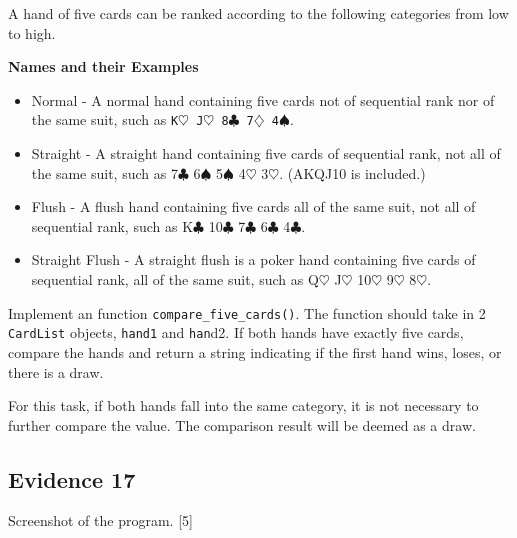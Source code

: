 A hand of five cards can be ranked according to the following categories
from low to high. 

\textbf{Names and their Examples }
\begin{itemize}
\item Normal - A normal hand containing five cards not of sequential rank
nor of the same suit, such as \texttt{K$\heartsuit$ J$\heartsuit$
8$\clubsuit$ 7$\diamondsuit$ 4}$\spadesuit$. 
\item Straight - A straight hand containing five cards of sequential rank,
not all of the same suit, such as 7\texttt{$\clubsuit$} 6$\spadesuit$
5$\spadesuit$ 4\texttt{$\heartsuit$} 3\texttt{$\heartsuit$}. (AKQJ10
is included.) 
\item Flush - A flush hand containing five cards all of the same suit, not
all of sequential rank, such as K\texttt{$\clubsuit$} 10\texttt{$\clubsuit$}
7\texttt{$\clubsuit$} 6\texttt{$\clubsuit$} 4\texttt{$\clubsuit$}. 
\item Straight Flush - A straight flush is a poker hand containing five
cards of sequential rank, all of the same suit, such as Q\texttt{$\heartsuit$}
J\texttt{$\heartsuit$} 10\texttt{$\heartsuit$} 9\texttt{$\heartsuit$}
8\texttt{$\heartsuit$}. 
\end{itemize}
Implement an function \texttt{compare\_five\_cards()}. The function
should take in 2 \texttt{CardList} objects, \texttt{hand1} and \texttt{han}d2.
If both hands have exactly five cards, compare the hands and return
a string indicating if the first hand wins, loses, or there is a draw. 

For this task, if both hands fall into the same category, it is not
necessary to further compare the value. The comparison result will
be deemed as a draw. 

\subsection*{Evidence 17}

Screenshot of the program. \hfill{} {[}5{]}